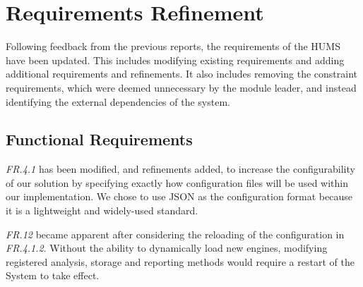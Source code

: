 \documentclass[10pt,a4paper]{article}
\begin{document}
\section{Requirements Refinement}
\label{sec:requirements}
Following feedback from the previous reports, the requirements of the HUMS have been updated. This includes modifying existing requirements and adding additional requirements and refinements. It also includes removing the constraint requirements, which were deemed unnecessary by the module leader, and instead identifying the external dependencies of the system.

\subsection{Functional Requirements}
\label{sec:functional_requirements}

\emph{FR.4.1} has been modified, and refinements added, to increase the configurability of our solution by specifying exactly how configuration files will be used within our implementation. We chose to use JSON as the configuration format because it is a lightweight and widely-used standard.

\emph{FR.12} became apparent after considering the reloading of the configuration in \emph{FR.4.1.2}. Without the ability to dynamically load new engines, modifying registered analysis, storage and reporting methods would require a restart of the System to take effect.
\end{document}
